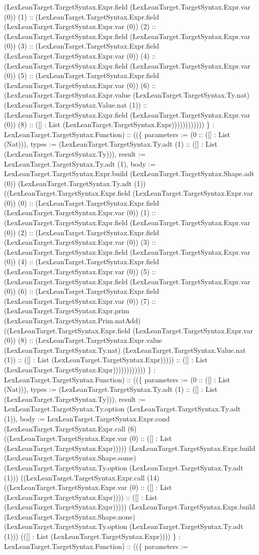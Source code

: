 \documentclass[11pt]{article}
\begin{document}
(LexLeanTarget.TargetSyntax.Expr.field (LexLeanTarget.TargetSyntax.Expr.var (0)) (1) :: (LexLeanTarget.TargetSyntax.Expr.field (LexLeanTarget.TargetSyntax.Expr.var (0)) (2) :: (LexLeanTarget.TargetSyntax.Expr.field (LexLeanTarget.TargetSyntax.Expr.var (0)) (3) :: (LexLeanTarget.TargetSyntax.Expr.field (LexLeanTarget.TargetSyntax.Expr.var (0)) (4) :: (LexLeanTarget.TargetSyntax.Expr.field (LexLeanTarget.TargetSyntax.Expr.var (0)) (5) :: (LexLeanTarget.TargetSyntax.Expr.field (LexLeanTarget.TargetSyntax.Expr.var (0)) (6) :: (LexLeanTarget.TargetSyntax.Expr.value (LexLeanTarget.TargetSyntax.Ty.nat) (LexLeanTarget.TargetSyntax.Value.nat (1)) :: (LexLeanTarget.TargetSyntax.Expr.field (LexLeanTarget.TargetSyntax.Expr.var (0)) (8) :: ([] : List (LexLeanTarget.TargetSyntax.Expr)))))))))))) \} : LexLeanTarget.TargetSyntax.Function) :: ((\{ parameters := (0 :: ([] : List (Nat))), types := (LexLeanTarget.TargetSyntax.Ty.adt (1) :: ([] : List (LexLeanTarget.TargetSyntax.Ty))), result := LexLeanTarget.TargetSyntax.Ty.adt (1), body := LexLeanTarget.TargetSyntax.Expr.build (LexLeanTarget.TargetSyntax.Shape.adt (0)) (LexLeanTarget.TargetSyntax.Ty.adt (1)) ((LexLeanTarget.TargetSyntax.Expr.field (LexLeanTarget.TargetSyntax.Expr.var (0)) (0) :: (LexLeanTarget.TargetSyntax.Expr.field (LexLeanTarget.TargetSyntax.Expr.var (0)) (1) :: (LexLeanTarget.TargetSyntax.Expr.field (LexLeanTarget.TargetSyntax.Expr.var (0)) (2) :: (LexLeanTarget.TargetSyntax.Expr.field (LexLeanTarget.TargetSyntax.Expr.var (0)) (3) :: (LexLeanTarget.TargetSyntax.Expr.field (LexLeanTarget.TargetSyntax.Expr.var (0)) (4) :: (LexLeanTarget.TargetSyntax.Expr.field (LexLeanTarget.TargetSyntax.Expr.var (0)) (5) :: (LexLeanTarget.TargetSyntax.Expr.field (LexLeanTarget.TargetSyntax.Expr.var (0)) (6) :: (LexLeanTarget.TargetSyntax.Expr.field (LexLeanTarget.TargetSyntax.Expr.var (0)) (7) :: (LexLeanTarget.TargetSyntax.Expr.prim (LexLeanTarget.TargetSyntax.Prim.natAdd) ((LexLeanTarget.TargetSyntax.Expr.field (LexLeanTarget.TargetSyntax.Expr.var (0)) (8) :: (LexLeanTarget.TargetSyntax.Expr.value (LexLeanTarget.TargetSyntax.Ty.nat) (LexLeanTarget.TargetSyntax.Value.nat (1)) :: ([] : List (LexLeanTarget.TargetSyntax.Expr))))) :: ([] : List (LexLeanTarget.TargetSyntax.Expr)))))))))))) \} : LexLeanTarget.TargetSyntax.Function) :: ((\{ parameters := (0 :: ([] : List (Nat))), types := (LexLeanTarget.TargetSyntax.Ty.adt (1) :: ([] : List (LexLeanTarget.TargetSyntax.Ty))), result := LexLeanTarget.TargetSyntax.Ty.option (LexLeanTarget.TargetSyntax.Ty.adt (1)), body := LexLeanTarget.TargetSyntax.Expr.cond (LexLeanTarget.TargetSyntax.Expr.call (6) ((LexLeanTarget.TargetSyntax.Expr.var (0) :: ([] : List (LexLeanTarget.TargetSyntax.Expr))))) (LexLeanTarget.TargetSyntax.Expr.build (LexLeanTarget.TargetSyntax.Shape.some) (LexLeanTarget.TargetSyntax.Ty.option (LexLeanTarget.TargetSyntax.Ty.adt (1))) ((LexLeanTarget.TargetSyntax.Expr.call (14) ((LexLeanTarget.TargetSyntax.Expr.var (0) :: ([] : List (LexLeanTarget.TargetSyntax.Expr)))) :: ([] : List (LexLeanTarget.TargetSyntax.Expr))))) (LexLeanTarget.TargetSyntax.Expr.build (LexLeanTarget.TargetSyntax.Shape.none) (LexLeanTarget.TargetSyntax.Ty.option (LexLeanTarget.TargetSyntax.Ty.adt (1))) (([] : List (LexLeanTarget.TargetSyntax.Expr)))) \} : LexLeanTarget.TargetSyntax.Function) :: ((\{ parameters := 
\end{document}
